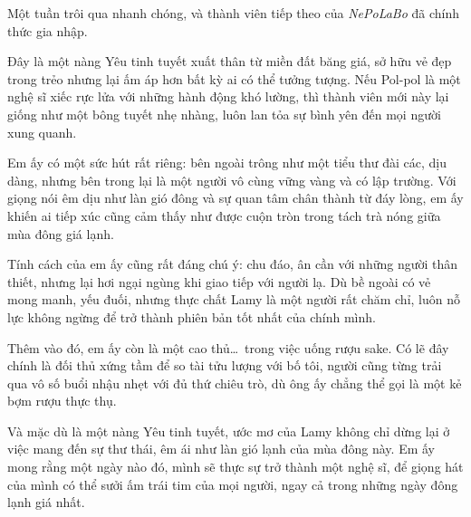 \documentclass[../main.tex]{subfiles}
\begin{document}


Một tuần trôi qua nhanh chóng, và thành viên tiếp theo của \textit{NePoLaBo} đã chính thức gia nhập.

Đây là một nàng Yêu tinh tuyết xuất thân từ miền đất băng giá, sở hữu vẻ đẹp trong trẻo nhưng lại ấm áp hơn bất kỳ ai có thể tưởng tượng. Nếu Pol-pol là một nghệ sĩ xiếc rực lửa với những hành động khó lường, thì thành viên mới này lại giống như một bông tuyết nhẹ nhàng, luôn lan tỏa sự bình yên đến mọi người xung quanh.

Em ấy có một sức hút rất riêng: bên ngoài trông như một tiểu thư đài các, dịu dàng, nhưng bên trong lại là một người vô cùng vững vàng và có lập trường. Với giọng nói êm dịu như làn gió đông và sự quan tâm chân thành từ đáy lòng, em ấy khiến ai tiếp xúc cũng cảm thấy như được cuộn tròn trong tách trà nóng giữa mùa đông giá lạnh.

Tính cách của em ấy cũng rất đáng chú ý: chu đáo, ân cần với những người thân thiết, nhưng lại hơi ngại ngùng khi giao tiếp với người lạ. Dù bề ngoài có vẻ mong manh, yếu đuối, nhưng thực chất Lamy là một người rất chăm chỉ, luôn nỗ lực không ngừng để trở thành phiên bản tốt nhất của chính mình.

Thêm vào đó, em ấy còn là một cao thủ\dots\ trong việc uống rượu sake. Có lẽ đây chính là đối thủ xứng tầm để so tài tửu lượng với bố tôi, người cũng từng trải qua vô số buổi nhậu nhẹt với đủ thứ chiêu trò, dù ông ấy chẳng thể gọi là một kẻ bợm rượu thực thụ.

Và mặc dù là một nàng Yêu tinh tuyết, ước mơ của Lamy không chỉ dừng lại ở việc mang đến sự thư thái, êm ái như làn gió lạnh của mùa đông này. Em ấy mong rằng một ngày nào đó, mình sẽ thực sự trở thành một nghệ sĩ, để giọng hát của mình có thể sưởi ấm trái tim của mọi người, ngay cả trong những ngày đông lạnh giá nhất.
\end{document}
